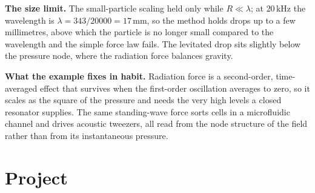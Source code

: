 \textbf{The size limit.} The small-particle scaling held only while
$R\ll\lambda$; at $20\,\si{\kilo\hertz}$ the wavelength is
$\lambda = 343/20000 = 17\,\si{\milli\meter}$, so the method holds drops up
to a few millimetres, above which the particle is no longer small compared
to the wavelength and the simple force law fails. The levitated drop sits
slightly below the pressure node, where the radiation force balances
gravity.

\textbf{What the example fixes in habit.} Radiation force is a second-order,
time-averaged effect that survives when the first-order oscillation averages
to zero, so it scales as the square of the pressure and needs the very high
levels a closed resonator supplies. The same standing-wave force sorts cells
in a microfluidic channel and drives acoustic tweezers, all read from the
node structure of the field rather than from its instantaneous pressure.

\section{Project}

